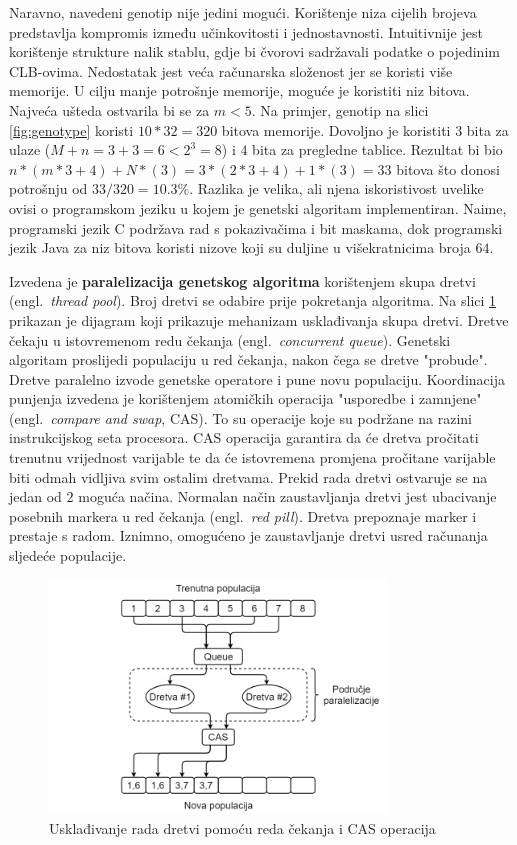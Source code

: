 \documentclass[times, utf8, diplomski]{fer}
\begin{document}
Naravno, navedeni genotip nije jedini mogući. Korištenje niza cijelih brojeva predstavlja kompromis između učinkovitosti i jednostavnosti. Intuitivnije jest korištenje strukture nalik stablu, gdje bi čvorovi sadržavali podatke o pojedinim CLB-ovima. Nedostatak jest veća računarska složenost jer se koristi više memorije. U cilju manje potrošnje memorije, moguće je koristiti niz bitova. Najveća ušteda ostvarila bi se za $m<5$. Na primjer, genotip na slici \ref{fig:genotype} koristi $10*32=320$ bitova memorije. Dovoljno je koristiti $3$ bita za ulaze ($M+n=3+3=6<2^{3}=8$) i $4$ bita za pregledne tablice. Rezultat bi bio $n*(m*3+4)+N*(3)=3*(2*3+4)+1*(3)=33$ bitova što donosi potrošnju od $33/320=10.3\%$. Razlika je velika, ali njena iskoristivost uvelike ovisi o programskom jeziku u kojem je genetski algoritam implementiran. Naime, programski jezik C podržava rad s pokazivačima i bit maskama, dok programski jezik Java za niz bitova koristi nizove koji su duljine u višekratnicima broja $64$.

Izvedena je \textbf{paralelizacija genetskog algoritma} korištenjem skupa dretvi (engl.~\textit{thread pool}). Broj dretvi se odabire prije pokretanja algoritma. Na slici \ref{fig:threads} prikazan je dijagram koji prikazuje mehanizam usklađivanja skupa dretvi. Dretve čekaju u istovremenom redu čekanja (engl.~\textit{concurrent queue}). Genetski algoritam proslijedi populaciju u red čekanja, nakon čega se dretve "probude". Dretve paralelno izvode genetske operatore i pune novu populaciju. Koordinacija punjenja izvedena je korištenjem atomičkih operacija "usporedbe i zamnjene" (engl.~\textit{compare and swap}, CAS). To su operacije koje su podržane na razini instrukcijskog seta procesora. CAS operacija garantira da će dretva pročitati trenutnu vrijednost varijable te da će istovremena promjena pročitane varijable biti odmah vidljiva svim ostalim dretvama. Prekid rada dretvi ostvaruje se na jedan od $2$ moguća načina. Normalan način zaustavljanja dretvi jest ubacivanje posebnih markera u red čekanja (engl.~\textit{red pill}). Dretva prepoznaje marker i prestaje s radom. Iznimno, omogućeno je zaustavljanje dretvi usred računanja sljedeće populacije.

\begin{figure}[htb]
	\centering
	\includegraphics[width=0.8\textwidth]{img/threads.png}
	\caption{Usklađivanje rada dretvi pomoću reda čekanja i CAS operacija}
	\label{fig:threads}
\end{figure}
\end{document}
